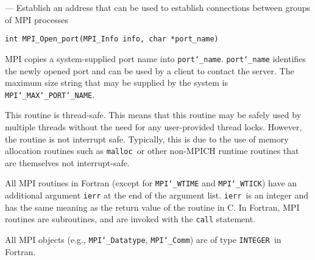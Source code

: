 \startmanpage
{}
--- Establish an address that can be used to establish  connections between groups of MPI processes 
\startvb\begin{verbatim}
int MPI_Open_port(MPI_Info info, char *port_name)

\end{verbatim}
\endvb

\par
{}
\par
{}
MPI copies a system-supplied port name into {\tt port{\tt \char`\_}name}. {\tt port{\tt \char`\_}name} identifies
the newly opened port and can be used by a client to contact the server.
The maximum size string that may be supplied by the system is
{\tt MPI{\tt \char`\_}MAX{\tt \char`\_}PORT{\tt \char`\_}NAME}.
\par
{}
\par
{}
\par
This routine is thread-safe.  This means that this routine may be
safely used by multiple threads without the need for any user-provided
thread locks.  However, the routine is not interrupt safe.  Typically,
this is due to the use of memory allocation routines such as {\tt malloc
}or other non-MPICH runtime routines that are themselves not interrupt-safe.
\par
{}
All MPI routines in Fortran (except for {\tt MPI{\tt \char`\_}WTIME} and {\tt MPI{\tt \char`\_}WTICK}) have
an additional argument {\tt ierr} at the end of the argument list.  {\tt ierr
}is an integer and has the same meaning as the return value of the routine
in C.  In Fortran, MPI routines are subroutines, and are invoked with the
{\tt call} statement.
\par
All MPI objects (e.g., {\tt MPI{\tt \char`\_}Datatype}, {\tt MPI{\tt \char`\_}Comm}) are of type {\tt INTEGER
}in Fortran.
